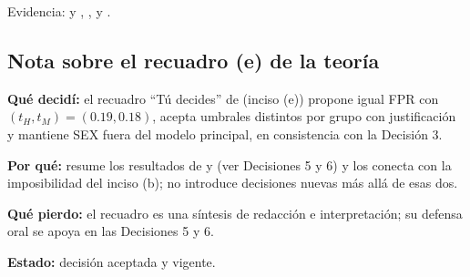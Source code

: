 Evidencia:  y
,
,
 y .

\subsection*{Nota sobre el recuadro (e) de la teoría}

\textbf{Qué decidí:} el recuadro ``Tú decides'' de
 (inciso (e)) propone igual FPR con
$(t_H,t_M)=(0.19,0.18)$, acepta umbrales distintos por grupo con justificación
y mantiene SEX fuera del modelo principal, en consistencia con la Decisión 3.

\textbf{Por qué:} resume los resultados de  y
 (ver Decisiones 5 y 6) y los conecta con la
imposibilidad del inciso (b); no introduce decisiones nuevas más allá de esas
dos.

\textbf{Qué pierdo:} el recuadro es una síntesis de redacción e
interpretación; su defensa oral se apoya en las Decisiones 5 y 6.

\textbf{Estado:} decisión aceptada y vigente.

